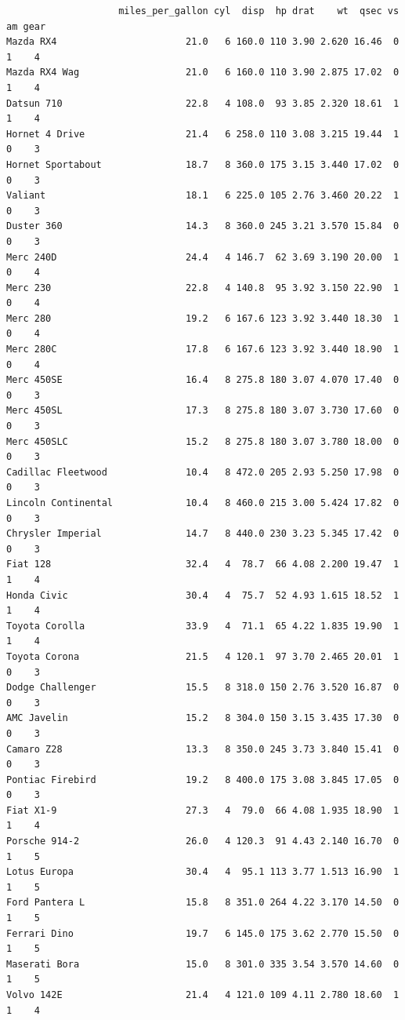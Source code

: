 \documentclass[
  letterpaper,
  DIV=11,
  numbers=noendperiod]{scrreprt}
\begin{document}
\begin{verbatim}
                    miles_per_gallon cyl  disp  hp drat    wt  qsec vs am gear
Mazda RX4                       21.0   6 160.0 110 3.90 2.620 16.46  0  1    4
Mazda RX4 Wag                   21.0   6 160.0 110 3.90 2.875 17.02  0  1    4
Datsun 710                      22.8   4 108.0  93 3.85 2.320 18.61  1  1    4
Hornet 4 Drive                  21.4   6 258.0 110 3.08 3.215 19.44  1  0    3
Hornet Sportabout               18.7   8 360.0 175 3.15 3.440 17.02  0  0    3
Valiant                         18.1   6 225.0 105 2.76 3.460 20.22  1  0    3
Duster 360                      14.3   8 360.0 245 3.21 3.570 15.84  0  0    3
Merc 240D                       24.4   4 146.7  62 3.69 3.190 20.00  1  0    4
Merc 230                        22.8   4 140.8  95 3.92 3.150 22.90  1  0    4
Merc 280                        19.2   6 167.6 123 3.92 3.440 18.30  1  0    4
Merc 280C                       17.8   6 167.6 123 3.92 3.440 18.90  1  0    4
Merc 450SE                      16.4   8 275.8 180 3.07 4.070 17.40  0  0    3
Merc 450SL                      17.3   8 275.8 180 3.07 3.730 17.60  0  0    3
Merc 450SLC                     15.2   8 275.8 180 3.07 3.780 18.00  0  0    3
Cadillac Fleetwood              10.4   8 472.0 205 2.93 5.250 17.98  0  0    3
Lincoln Continental             10.4   8 460.0 215 3.00 5.424 17.82  0  0    3
Chrysler Imperial               14.7   8 440.0 230 3.23 5.345 17.42  0  0    3
Fiat 128                        32.4   4  78.7  66 4.08 2.200 19.47  1  1    4
Honda Civic                     30.4   4  75.7  52 4.93 1.615 18.52  1  1    4
Toyota Corolla                  33.9   4  71.1  65 4.22 1.835 19.90  1  1    4
Toyota Corona                   21.5   4 120.1  97 3.70 2.465 20.01  1  0    3
Dodge Challenger                15.5   8 318.0 150 2.76 3.520 16.87  0  0    3
AMC Javelin                     15.2   8 304.0 150 3.15 3.435 17.30  0  0    3
Camaro Z28                      13.3   8 350.0 245 3.73 3.840 15.41  0  0    3
Pontiac Firebird                19.2   8 400.0 175 3.08 3.845 17.05  0  0    3
Fiat X1-9                       27.3   4  79.0  66 4.08 1.935 18.90  1  1    4
Porsche 914-2                   26.0   4 120.3  91 4.43 2.140 16.70  0  1    5
Lotus Europa                    30.4   4  95.1 113 3.77 1.513 16.90  1  1    5
Ford Pantera L                  15.8   8 351.0 264 4.22 3.170 14.50  0  1    5
Ferrari Dino                    19.7   6 145.0 175 3.62 2.770 15.50  0  1    5
Maserati Bora                   15.0   8 301.0 335 3.54 3.570 14.60  0  1    5
Volvo 142E                      21.4   4 121.0 109 4.11 2.780 18.60  1  1    4

\end{verbatim}
\end{document}
